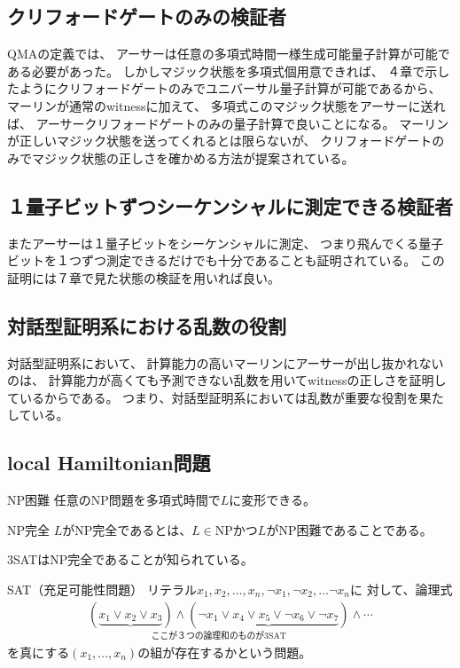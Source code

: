 \documentclass[a4paper, 10pt]{jsarticle}
\begin{document}
\subsection{クリフォードゲートのみの検証者}
QMAの定義では、
アーサーは任意の多項式時間一様生成可能量子計算が可能である必要があった。
しかしマジック状態を多項式個用意できれば、
４章で示したようにクリフォードゲートのみでユニバーサル量子計算が可能であるから、
マーリンが通常のwitnessに加えて、
多項式このマジック状態をアーサーに送れば、
アーサークリフォードゲートのみの量子計算で良いことになる。
マーリンが正しいマジック状態を送ってくれるとは限らないが、
クリフォードゲートのみでマジック状態の正しさを確かめる方法が提案されている。

\subsection{１量子ビットずつシーケンシャルに測定できる検証者}
またアーサーは１量子ビットをシーケンシャルに測定、
つまり飛んでくる量子ビットを１つずつ測定できるだけでも十分であることも証明されている。
この証明には７章で見た状態の検証を用いれば良い。

\subsection{対話型証明系における乱数の役割}
対話型証明系において、
計算能力の高いマーリンにアーサーが出し抜かれないのは、
計算能力が高くても予測できない乱数を用いてwitnessの正しさを証明しているからである。
つまり、対話型証明系においては乱数が重要な役割を果たしている。

\subsection{local Hamiltonian問題}
\begin{dfn}{NP困難}{}
	任意のNP問題を多項式時間で$L$に変形できる。
\end{dfn}

\begin{dfn}{NP完全}{}
	$L$がNP完全であるとは、$L \in \mathrm{NP}$かつ$L$がNP困難であることである。
\end{dfn}

3SATはNP完全であることが知られている。
\begin{dfn}{SAT（充足可能性問題）}{}
	リテラル$x_1, x_2, \dots, x_n, \lnot x_1, \lnot x_2, \dots \lnot x_n$に
	対して、論理式
	\begin{align}
		\underset{\mathrm{ここが３つの論理和のものが3SAT}}
		{(\underbrace{x_1 \lor x_2 \lor x_3}) \land (\underbrace{
			\lnot x_1 \lor x_4 \lor x_5 \lor \lnot x_6 \lor \lnot x_7
		})} \land \cdots
	\end{align}
	を真にする$(x_1, \dots, x_n)$の組が存在するかという問題。
\end{dfn}
\end{document}
